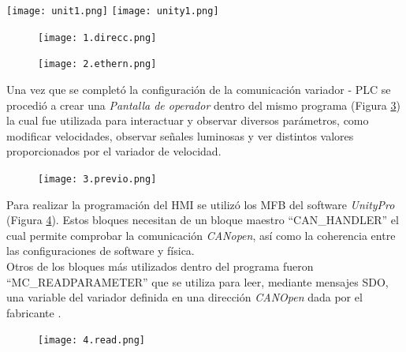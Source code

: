 \begin{center}
	\texttt{[image: unit1.png]}
	\label{fig:uni1}
	\texttt{[image: unity1.png]}
	\label{fig:uni0}
\end{center}

\begin{figure}[h]
	\centering
	\texttt{[image: 1.direcc.png]}
	\label{fig:direcc}
\end{figure}


\begin{figure}[h]
	\centering
	\texttt{[image: 2.ethern.png]}
	\label{fig:inter}
\end{figure}

Una vez que se completó la configuración de la comunicación variador - PLC se procedió a crear una \textit{Pantalla de operador} dentro del mismo programa (Figura \ref{fig:previo})
la cual fue utilizada para interactuar y observar diversos parámetros, como modificar velocidades, observar señales luminosas y ver distintos valores proporcionados por el variador de velocidad.
 
\begin{figure}[H]
	\centering
	\texttt{[image: 3.previo.png]}
	\label{fig:previo}
\end{figure}

Para realizar la programación del HMI se utilizó los MFB del software \textit{UnityPro} (Figura \ref{fig:read}). Estos bloques necesitan de un bloque maestro ``CAN\_HANDLER'' el cual permite comprobar la comunicación \textit{CANopen}, así como la coherencia
entre las configuraciones de software y física.
\\
Otros de los bloques más utilizados dentro del programa fueron ``MC\_READPARAMETER'' que se utiliza para leer, mediante mensajes SDO, una variable del variador definida en una dirección \textit{CANOpen} dada por el fabricante \cite{ComManual}.

\begin{figure}[H]
	\centering
	\texttt{[image: 4.read.png]}
	\label{fig:read}
\end{figure}



